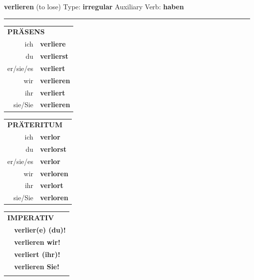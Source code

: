 \documentclass[10pt,a4paper]{revtex4-2}
\begin{document}
\begin{verbbox}
    {\Large \bf verlieren} (to lose) \hfill Type: \textbf{irregular} \hfill Auxiliary Verb: \textbf{haben} 
    
     \vspace{5pt}

    \hrule
    
    \vspace{5pt}

  \begin{tabular}{rl}
     \multicolumn{2}{l}{\textbf{PRÄSENS} }\\
    ich & \textbf{verliere}\\
    du & \textbf{verlierst}\\
    er/sie/es & \textbf{verliert}\\
    wir & \textbf{verlieren}\\
    ihr & \textbf{verliert}\\
    sie/Sie & \textbf{verlieren}\\
  \end{tabular}
  \hfill
     \begin{tabular}{rl}
    \multicolumn{2}{l}{\textbf{PRÄTERITUM} }\\
    ich & \textbf{verlor}\\
    du & \textbf{verlorst}\\
    er/sie/es & \textbf{verlor}\\
    wir & \textbf{verloren}\\
    ihr & \textbf{verlort}\\
    sie/Sie & \textbf{verloren}\\
  \end{tabular}
  \hfill
  \begin{tabular}{rl}
     \multicolumn{2}{l}{\textbf{IMPERATIV} }\\
   & \textbf{verlier(e) (du)!}\\
   & \textbf{verlieren wir!}\\
   & \textbf{verliert (ihr)!}\\
   & \textbf{verlieren Sie!}\\
   & \vspace{10pt}
  \end{tabular}

    \vspace{10pt}


\end{verbbox}
\end{document}
